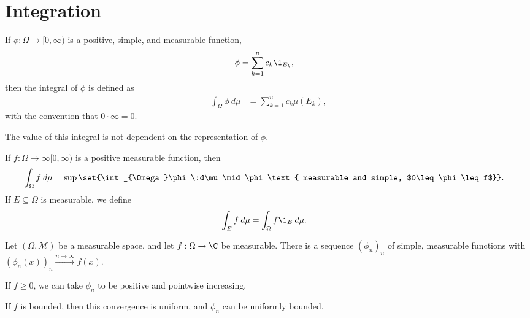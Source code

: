 \section{Integration}%
\begin{definition}
  If $\phi\colon \Omega\rightarrow [0,\infty)$ is a positive, simple, and measurable function, 
  \begin{align*}
    \phi &= \sum_{k=1}^{n}c_k\1_{E_k},
  \end{align*}
  then the integral of $\phi$ is defined as
  \begin{align*}
    \int_{\Omega}\phi\:d\mu &= \sum_{k=1}^{n}c_k\mu\left(E_k\right),
  \end{align*}
  with the convention that $0\cdot \infty = 0$.\newline
   
  The value of this integral is not dependent on the representation of $\phi$.
\end{definition}
\begin{definition}
  If $f\colon \Omega\rightarrow\infty [0,\infty)$ is a positive measurable function, then
  \begin{align*}
    \int_{\Omega}f\:d\mu &= \sup\set{\int_{\Omega}\phi\:d\mu\mid \phi\text{ measurable and simple, $0\leq \phi \leq f$}}.
  \end{align*}
  If $E\subseteq \Omega$ is measurable, we define
  \begin{align*}
    \int_{E} f\:d\mu &= \int_{\Omega}f\1_{E}\:d\mu.
  \end{align*}
\end{definition}
\begin{proposition}
  Let $\left(\Omega,\mathcal{M}\right)$ be a measurable space, and let $f:\Omega\rightarrow \C$ be measurable. There is a sequence $\left(\phi_{n}\right)_n$ of simple, measurable functions with $\left(\phi_{n}\left(x\right)\right)_{n}\xrightarrow{n\rightarrow\infty}f(x)$.\newline

  If $f\geq 0$, we can take $\phi_n$ to be positive and pointwise increasing.\newline

  If $f$ is bounded, then this convergence is uniform, and $\phi_{n}$ can be uniformly bounded.
\end{proposition}

